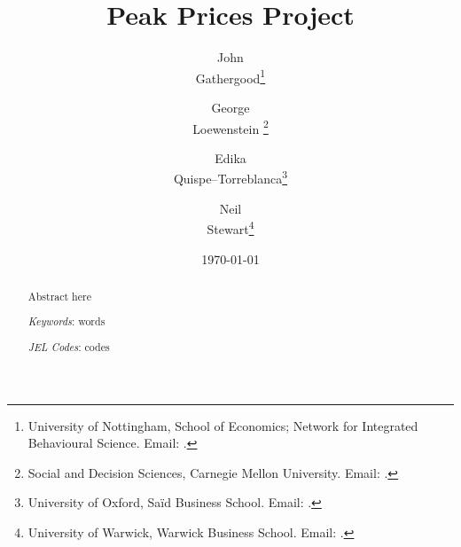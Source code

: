 
\title{Peak Prices Project}

\author{%
   John \\ Gathergood\thanks{University of Nottingham, School of Economics; Network for Integrated Behavioural Science. Email: .}%
   \and%
   George \\ Loewenstein%
   \thanks{Social and Decision Sciences, Carnegie Mellon University. Email: .}%
   \and%
   Edika \\ Quispe--Torreblanca\thanks{University of Oxford, Sa\"{i}d Business School. Email: .}%
    \and%
   Neil \\ Stewart\thanks{University of Warwick, Warwick Business School. Email: .}%
}

\date{%
	\vspace{1cm}\large%
	\today%
	\normalsize\\[1cm]%
}

\maketitle

\onehalfspacing

\begin{abstract}
   \noindent Abstract here
   
   \vspace{2ex}\noindent%
   \textit{Keywords}: words

   \vspace{.5ex}\noindent%
   \textit{JEL Codes}: codes%
\end{abstract}
